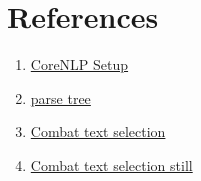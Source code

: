 \documentclass{article}
\begin{document}
\section{References}
\begin{enumerate}
    \item \href{https://bbengfort.github.io/2018/06/corenlp-nltk-parses/}{CoreNLP Setup}
    \item \href{https://stackoverflow.com/questions/42322902/how-to-get-parse-tree-using-python-nltk}{parse tree}
    \item \href{https://tex.stackexchange.com/questions/507288/minted-make-text-non-selectable-on-output-pdf}{Combat text selection}
    \item \href{https://stackoverflow.com/questions/28797418/replace-all-font-glyphs-in-a-pdf-by-converting-them-to-outline-shapes}{Combat text selection still}
\end{enumerate}
\end{document}
